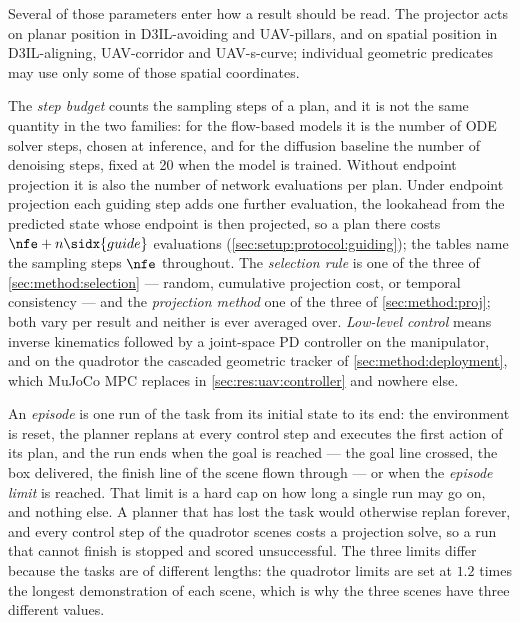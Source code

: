Several of those parameters enter how a result should be read. The projector acts on planar position in
D3IL-avoiding and UAV-pillars, and on spatial position in D3IL-aligning, UAV-corridor and UAV-s-curve;
individual geometric predicates may use only some of those spatial coordinates.

The \emph{step budget} counts the sampling steps of a plan, and it is not the same quantity in the two
families: for the flow-based models it is the number of ODE solver steps, chosen at inference, and for
the diffusion baseline the number of denoising steps, fixed at 20 when the model is trained. Without
endpoint projection it is also the number of network evaluations per plan. Under endpoint projection each
guiding step adds one further evaluation, the lookahead from the predicted state whose endpoint is then
projected, so a plan there costs
$\nfe + n\sidx{guide}$ evaluations (\autoref{sec:setup:protocol:guiding}); the tables name the sampling
steps $\nfe$ throughout.
The \emph{selection rule} is one of the three of \autoref{sec:method:selection} --- random, cumulative
projection cost, or temporal consistency --- and the \emph{projection method} one of the three of
\autoref{sec:method:proj}; both vary per result and neither is ever averaged over. \emph{Low-level
control} means inverse kinematics followed by a joint-space PD controller on the manipulator, and on the
quadrotor the cascaded geometric tracker of \autoref{sec:method:deployment}, which MuJoCo MPC replaces in
\autoref{sec:res:uav:controller} and nowhere else.

An \emph{episode} is one run of the task from its initial state to its end: the environment is reset, the
planner replans at every control step and executes the first action of its plan, and the run ends when the
goal is reached --- the goal line crossed, the box delivered, the finish line of the scene flown through
--- or when the \emph{episode limit} is reached. That limit is a hard cap on how long a single run may
go on, and nothing else. A planner that has lost the task would otherwise replan forever, and every control step of the
quadrotor scenes costs a projection solve, so a run that cannot finish is stopped and scored unsuccessful.
The three limits differ because the tasks are of different lengths: the quadrotor limits are set at $1.2$
times the longest demonstration of each scene, which is why the three scenes have three different values.

